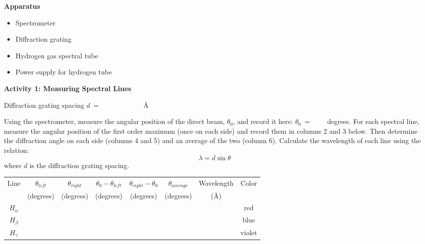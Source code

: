 \textbf{Apparatus}

\begin{itemize}

\item Spectrometer

\item Diffraction grating

\item Hydrogen gas spectral tube

\item Power supply for hydrogen tube

\end{itemize}

\vspace{0.2in}

\textbf{Activity 1: Measuring Spectral Lines}

\bigskip

\noindent Diffraction grating spacing $d ~ = ~\qquad\qquad\qquad${\AA}
 
Using the spectrometer, measure the angular position of the direct beam, 
$\theta_{0}$, and record it here: $\theta_{0} ~ = ~\qquad$degrees. 
For each spectral line, measure the angular position of the first order maximum 
(once on each side) and record them in columns 2 and 3 below. Then determine 
the diffraction angle on each side (columns 4 and 5) and an average of the two 
(column 6). 
Calculate the wavelength of each line using the relation:
\begin{equation}
\lambda = d \sin \theta
\end{equation}
where $d$ is the diffraction grating spacing.

\vspace{0.25in}

\begin{center}
\begin{tabular}{|c|c|c|c|c|c|c|c|}\hline
Line        & $\theta_{left}$     & $\theta_{right}$    & $\theta_{0} - \theta_{left}$   & $\theta_{right} - \theta_{0}$    & $\theta_{average}$ & Wavelength  & Color \\ 
            & (degrees)  &  (degrees)  & (degrees)  & (degrees)  & (degrees)  & ({\AA})     &        \\ \hline
$H_\alpha$  &          &         &        &      &      &    & red     \\ \hline
$H_\beta$   &          &         &        &      &      &    & blue  \\ \hline
$H_\gamma$  &          &         &        &      &      &    & violet  \\ \hline
\end{tabular}
\end{center}

